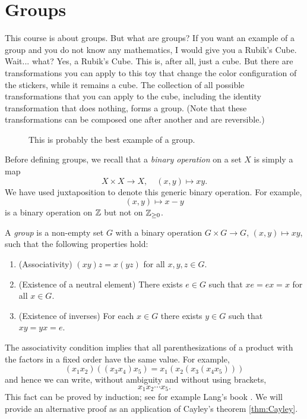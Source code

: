 \section{Groups}
\lecture\label{lec:groups}

This course is about groups. But what are groups?  If you want an example of a
group and you do not know any mathematics, I would give you a Rubik's Cube.
Wait... what? Yes, a Rubik's Cube. This is, after all, just a cube. But there are
transformations you can apply to this toy that change the color configuration
of the stickers, while it remains a cube.
The collection of all possible transformations that you can apply to the cube, including the identity transformation that does nothing, forms a group. (Note that these transformations can be composed one after another and are reversible.)

\begin{figure}[h]
\caption{This is probably the best example of a group.}
\end{figure}

Before defining groups, we recall that a \emph{binary operation} on a set $X$
is simply a map 
\[
X\times X\to X,
\quad (x,y)\mapsto xy.
\]
We have used 
juxtaposition to denote this generic binary operation. For example,
\[
(x,y)\mapsto x-y
\]
is a binary operation on $\mathbb{Z}$ but not
on $\mathbb{Z}_{\geq 0}$.

\begin{definition}
A \emph{group} is a non-empty set $G$ with a binary operation
$G\times G\to G$, $(x,y)\mapsto xy$, such that
the following properties hold:
\begin{enumerate}
  \item (Associativity) $(xy)z=x(yz)$ for all $x,y,z\in G$.
    \item (Existence of a neutral element) There exists $e\in G$ such that $xe=ex=x$ for all $x\in G$.
    \item (Existence of inverses) For each $x\in G$ there exists $y\in G$ such that $xy=yx=e$.
\end{enumerate}
\end{definition}

The associativity condition implies that all parenthesizations of a product
with the factors in a fixed order have the same value.
For example,
\[
(x_1x_2)((x_3x_4)x_5)=x_1(x_2(x_3(x_4x_5)))
\]
and hence we can write, without ambiguity and without using brackets, 
\[
x_1x_2\cdots x_5.
\]
This fact can be proved by induction; see for example
Lang's book \cite{MR783636}. We will provide an alternative proof as an application
of Cayley's theorem \ref{thm:Cayley}. 

